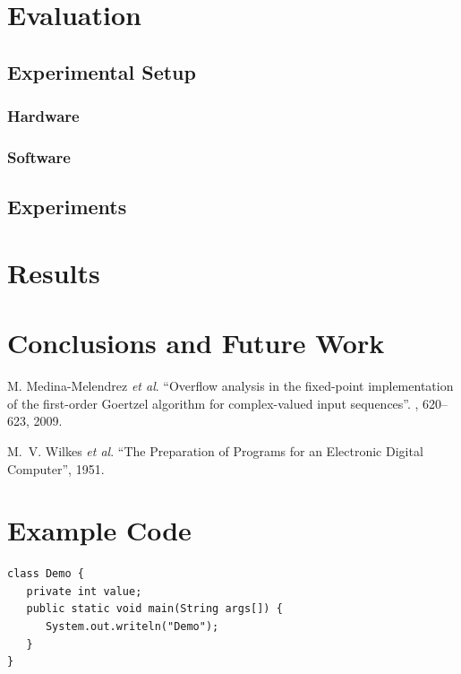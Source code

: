 \documentclass[a4paper,12pt]{report}
\begin{document}
\chapter{Evaluation}

\section{Experimental Setup}

\subsection{Hardware}

\subsection{Software}

\section{Experiments}

\chapter{Results}

\chapter{Conclusions and Future Work}

\begin{thebibliography}{1}

M. Medina-Melendrez \textit{et al}.
\newblock ``{Overflow analysis in the fixed-point implementation of the first-order Goertzel algorithm for complex-valued input sequences}''.
, 620--623, 2009.

M.~V. Wilkes \textit{et al}. 
\newblock ``{The Preparation of Programs for an Electronic Digital Computer}'',  1951.

\end{thebibliography}

\appendix

\chapter{Example Code}
\label{app-SC}

\begin{verbatim}
class Demo {
   private int value;
   public static void main(String args[]) {
      System.out.writeln("Demo");
   }
}
\end{verbatim}
\end{document}
